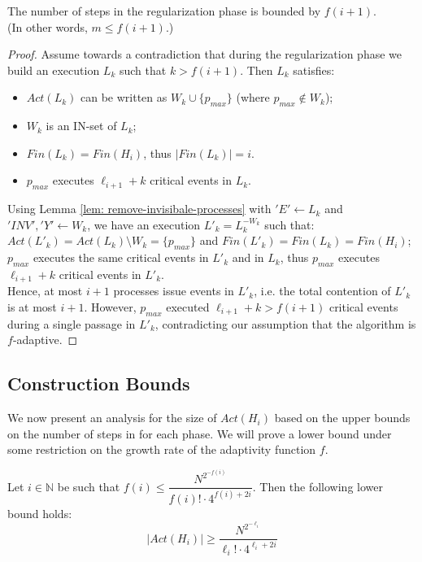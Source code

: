 \begin{claim-section} \label{claim: regularization-upper-bound}
	The number of steps in the regularization phase is bounded by $f(i+1)$. \\ (In other words, $m \leq f(i+1)$.)
\end{claim-section}
\begin{proof}
	Assume towards a contradiction that during the regularization phase we build an execution $L_k$ such that $k > f(i+1)$. Then $L_k$ satisfies:
	\begin{itemize}
		\item $Act(L_k)$ can be written as $W_k \cup \{p_{max}\}$ (where $p_{max} \notin W_k$);
		\item $W_k$ is an IN-set of $L_k$;
		\item $Fin(L_k) = Fin(H_i)$, thus $|Fin(L_k)| = i$.
		\item $p_{max}$ executes $\ell_{i+1}+k$ critical events in $L_k$.
	\end{itemize}
	Using Lemma \ref{lem: remove-invisibale-processes} with $'E' \leftarrow L_k$ and $'INV','Y' \leftarrow W_k$, we have an execution $L'_k = L_k^{-W_k}$ such that: $Act(L'_k) = Act(L_k) \setminus W_k = \{p_{max}\}$ and $Fin(L'_k) = Fin(L_k) = Fin(H_i)$; $p_{max}$ executes the same critical events in $L'_k$ and in $L_k$, thus $p_{max}$ executes $\ell_{i+1}+k$ critical events in $L'_k$.
	\\ Hence, at most $i+1$ processes issue events in $L'_k$, i.e. the total contention of $L'_k$ is at most $i+1$. However, $p_{max}$ executed $\ell_{i+1}+k > f(i+1)$ critical events during a single passage in $L'_k$, contradicting our assumption that the algorithm is $f$-adaptive.
\end{proof}




\subsection{Construction Bounds}
We now present an analysis for the size of $Act(H_i)$ based on the upper bounds on the number of steps in for each phase. We will prove a lower bound under some restriction on the growth rate of the adaptivity function $f$.

\begin{theorem} \label{theorem: Act-lower-bound}
	Let $i \in \mathbb{N}$ be such that $f(i) \leq \dfrac{N^{2^{-f(i)}}} {f(i)! \cdot 4^{f(i)+2i}}$. Then the following lower bound holds:
	$$|Act(H_i)| \geq \frac{N^{2^{-\ell_i}}}{\ell_i! \cdot 4^{\ell_i+2i}}$$
\end{theorem}



